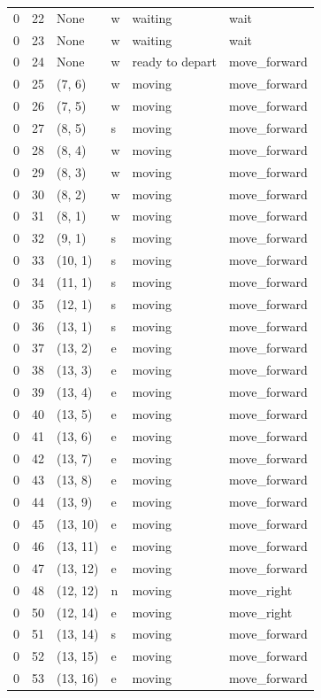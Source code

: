 \documentclass[12pt, a4paper]{llncs}
\begin{document}
\begin{table}[htbp]
\begin{tabular}{llllll}
    0 & 22 & None & w & waiting & wait \\
    0 & 23 & None & w & waiting & wait \\
    0 & 24 & None & w & ready to depart & move\_forward \\
    0 & 25 & (7, 6) & w & moving & move\_forward \\
    0 & 26 & (7, 5) & w & moving & move\_forward \\
    0 & 27 & (8, 5) & s & moving & move\_forward \\
    0 & 28 & (8, 4) & w & moving & move\_forward \\
    0 & 29 & (8, 3) & w & moving & move\_forward \\
    0 & 30 & (8, 2) & w & moving & move\_forward \\
    0 & 31 & (8, 1) & w & moving & move\_forward \\
    0 & 32 & (9, 1) & s & moving & move\_forward \\
    0 & 33 & (10, 1) & s & moving & move\_forward \\
    0 & 34 & (11, 1) & s & moving & move\_forward \\
    0 & 35 & (12, 1) & s & moving & move\_forward \\
    0 & 36 & (13, 1) & s & moving & move\_forward \\
    0 & 37 & (13, 2) & e & moving & move\_forward \\
    0 & 38 & (13, 3) & e & moving & move\_forward \\
    0 & 39 & (13, 4) & e & moving & move\_forward \\
    0 & 40 & (13, 5) & e & moving & move\_forward \\
    0 & 41 & (13, 6) & e & moving & move\_forward \\
    0 & 42 & (13, 7) & e & moving & move\_forward \\
    0 & 43 & (13, 8) & e & moving & move\_forward \\
    0 & 44 & (13, 9) & e & moving & move\_forward \\
    0 & 45 & (13, 10) & e & moving & move\_forward \\
    0 & 46 & (13, 11) & e & moving & move\_forward \\
    0 & 47 & (13, 12) & e & moving & move\_forward \\
    0 & 48 & (12, 12) & n & moving & move\_right \\
    0 & 50 & (12, 14) & e & moving & move\_right \\
    0 & 51 & (13, 14) & s & moving & move\_forward \\
    0 & 52 & (13, 15) & e & moving & move\_forward \\
    0 & 53 & (13, 16) & e & moving & move\_forward \\
    \bottomrule
  \end{tabular}
\end{table}
\end{document}
